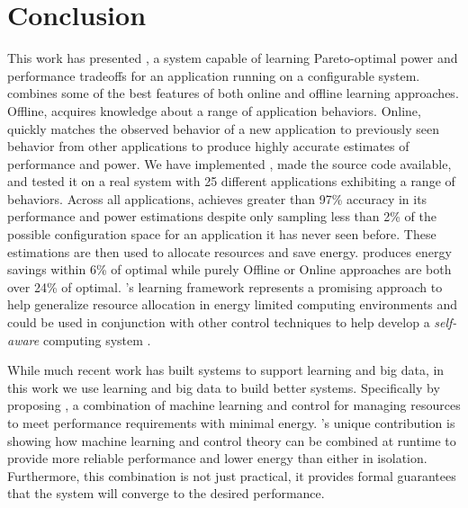 \section{Conclusion}
This work has presented \SYSTEMLEO{}, a system capable of learning
Pareto-optimal power and performance tradeoffs for an application
running on a configurable system.  \SYSTEMLEO{} combines some of the best
features of both online and offline learning approaches.  Offline,
\SYSTEMLEO{} acquires knowledge about a range of application behaviors.
Online, \SYSTEMLEO{} quickly matches the observed behavior of a new
application to previously seen behavior from other applications to
produce highly accurate estimates of performance and power.  We have
implemented \SYSTEMLEO{}, made the source code available, and tested it
on a real system with 25 different applications exhibiting a range of
behaviors.  Across all applications, \SYSTEMLEO{} achieves greater than
97\% accuracy in its performance and power estimations despite only
sampling less than 2\% of the possible configuration space for an
application it has never seen before.  These estimations are then used
to allocate resources and save energy.  \SYSTEMLEO{} produces energy
savings within 6\% of optimal while purely Offline or Online
approaches are both over 24\% of optimal.  \SYSTEMLEO{}'s learning
framework represents a promising approach to help generalize resource
allocation in energy limited computing environments and could be used
in conjunction with other control techniques to help develop a
\emph{self-aware} computing system
\cite{Hoffmann2012,1508273,1333571,1516538,Kephardt2005,laddaga1999}.

While much recent work has built systems to support learning and big
data, in this work we use learning and big data to build better
systems.  Specifically by proposing \SYSTEM{}, a combination of
machine learning and control for managing resources to meet
performance requirements with minimal energy.  \SYSTEM{}'s unique
contribution is showing how machine learning and control theory can be
combined at runtime to provide more reliable performance and lower
energy than either in isolation.  Furthermore, this combination is not
just practical, it provides formal guarantees that the system will
converge to the desired performance.

